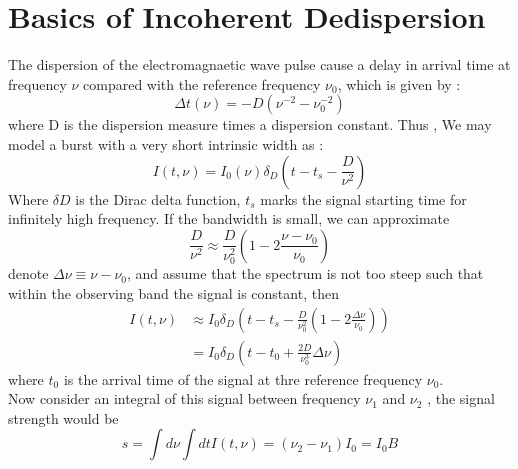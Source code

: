 \documentclass[twocolumn]{aastex61}
\begin{document}



\section{Basics of Incoherent Dedispersion}
\label{sec:obs}

The dispersion of the electromagnaetic wave pulse cause a delay in arrival time at frequency $\nu$ compared with the reference frequency $\nu_0$, which is given by :
\begin{equation}
\Delta t (\nu) = -D(\nu^{-2} -\nu^{-2}_{0})\label{eq:Disperse relation}
\end{equation}
where D is the dispersion measure times a dispersion constant. Thus , We may model a burst with a very short intrinsic width as :
\begin{equation}
I(t,\nu)=I_0(\nu)\delta_D(t-t_s -\frac{D}{\nu^2})  
\end{equation}
Where $\delta D$ is the Dirac delta function, $t_s$ marks the signal starting time for infinitely high frequency. If the bandwidth is small, we can approximate
\begin{equation*}
\frac{D}{\nu^{2}}\approx\frac{D}{\nu_0^2}(1-2\frac{\nu-\nu_0}{\nu_0})
\end{equation*}
denote $\Delta　\nu \equiv \nu - \nu_0$, and assume that the spectrum is not too steep such that within the observing band the signal is constant, then
\begin{equation}
\begin{aligned}
I(t,\nu) & \approx I_0\delta_D(t-t_s-\frac{D}{\nu_0^2}(1-2\frac{\Delta\nu}{\nu_0}) ) \\
		 & = I_0\delta_D(t -t_0 +\frac{2D}{\nu_0^3}\Delta\nu)
\end{aligned} 
\end{equation}
where $t_0$ is the arrival time of the signal at thre reference frequency $\nu_0$. \\
	Now consider an integral of this signal between frequency $\nu_1 $ and $\nu_2$ , the signal strength would be
\begin{equation}
s = \int d \nu \int dtI(t,\nu)=(\nu_2 -\nu_1)I_0 = I_0B
\end{equation}
\end{document}
